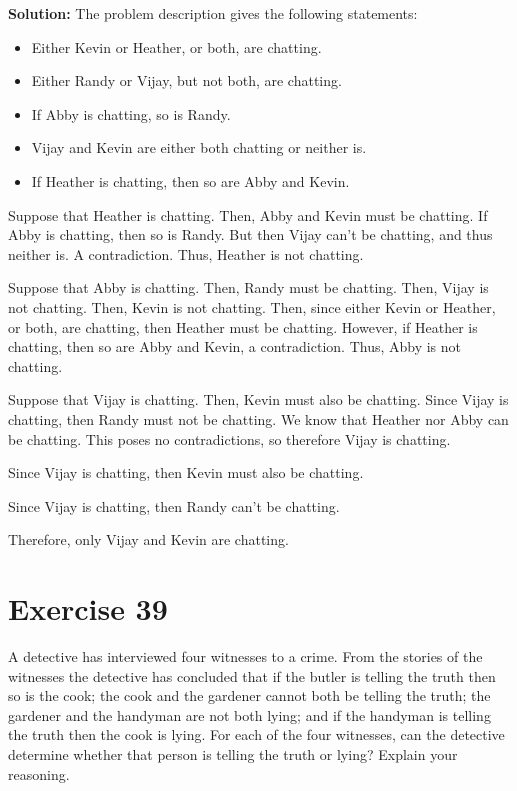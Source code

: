 \documentclass{Axon}
\begin{document}
\noindent
\textbf{Solution:}
The problem description gives the following statements:
\begin{itemize}
    \item Either Kevin or Heather, or both, are chatting.
    \item Either Randy or Vijay, but not both, are chatting.
    \item If Abby is chatting, so is Randy.
    \item Vijay and Kevin are either both chatting or neither is.
    \item If Heather is chatting, then so are Abby and Kevin.
\end{itemize}

Suppose that Heather is chatting. Then, Abby and Kevin must be chatting. If Abby is chatting, then so is Randy. But then Vijay can't be chatting, and thus neither is. A contradiction. Thus, Heather is not chatting.

Suppose that Abby is chatting. Then, Randy must be chatting. Then, Vijay is not chatting. Then, Kevin is not chatting. Then, since either Kevin or Heather, or both, are chatting, then Heather must be chatting. However, if Heather is chatting, then so are Abby and Kevin, a contradiction. Thus, Abby is not chatting.

Suppose that Vijay is chatting. Then, Kevin must also be chatting. Since Vijay is chatting, then Randy must not be chatting. We know that Heather nor Abby can be chatting. This poses no contradictions, so therefore Vijay is chatting.

Since Vijay is chatting, then Kevin must also be chatting.

Since Vijay is chatting, then Randy can't be chatting. 

Therefore, only Vijay and Kevin are chatting.

\section*{Exercise 39}
A detective has interviewed four witnesses to a crime. From the stories of the witnesses the detective has concluded that if the butler is telling the truth then so is the cook; the cook and the gardener cannot both be telling the truth; the gardener and the handyman are not both lying; and if the handyman is telling the truth then the cook is lying. For each of the four witnesses, can the detective determine whether that person is telling the truth or lying? Explain your reasoning.
\end{document}
